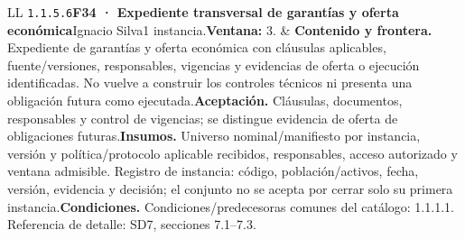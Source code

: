 \begin{longtable}{L{\tabcolsep\relax}L{\tabcolsep\relax}}
\texttt{1.\allowbreak{}1.\allowbreak{}5.\allowbreak{}6}\newline{}\textbf{F34 · Expediente transversal de garantías y oferta económica}\newline{}Ignacio Silva\newline{}1 instancia.\newline{}\textbf{Ventana:} 3. & \textbf{Contenido y frontera.} Expediente de garantías y oferta económica con cláusulas aplicables, fuente/versiones, responsables, vigencias y evidencias de oferta o ejecución identificadas. No vuelve a construir los controles técnicos ni presenta una obligación futura como ejecutada.\newline{}\textbf{Aceptación.} Cláusulas, documentos, responsables y control de vigencias; se distingue evidencia de oferta de obligaciones futuras.\newline{}\textbf{Insumos.} Universo nominal/manifiesto por instancia, versión y política/protocolo aplicable recibidos, responsables, acceso autorizado y ventana admisible. Registro de instancia: código, población/activos, fecha, versión, evidencia y decisión; el conjunto no se acepta por cerrar solo su primera instancia.\newline{}\textbf{Condiciones.} Condiciones/predecesoras comunes del catálogo: 1.1.1.1. Referencia de detalle: SD7, secciones 7.1--7.3.\\\hline
\end{longtable}\endgroup
\begingroup\setlength{\tabcolsep}{3pt}

